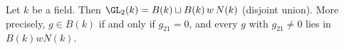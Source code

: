 Let $k$ be a field. Then $\GL_2(k)=B(k)\sqcup B(k)\,w\,N(k)$ (disjoint union). More precisely, $g\in B(k)$ if and only
if $g_{21}=0$, and every $g$ with $g_{21}\neq0$ lies in $B(k)wN(k)$.
